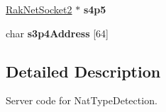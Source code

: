 \begin{DoxyCompactItemize}
\item 
\hypertarget{class_rak_net_1_1_nat_type_detection_server_ac424468c0ed82f894674961a1f6cddc6}{\hyperlink{class_rak_net_1_1_rak_net_socket2}{Rak\-Net\-Socket2} $\ast$ {\bfseries s4p5}}\label{class_rak_net_1_1_nat_type_detection_server_ac424468c0ed82f894674961a1f6cddc6}

\item 
\hypertarget{class_rak_net_1_1_nat_type_detection_server_aba122c35a9778366c284db84ef8bc78b}{char {\bfseries s3p4\-Address} \mbox{[}64\mbox{]}}\label{class_rak_net_1_1_nat_type_detection_server_aba122c35a9778366c284db84ef8bc78b}

\end{DoxyCompactItemize}


\subsection{Detailed Description}
Server code for Nat\-Type\-Detection. 


